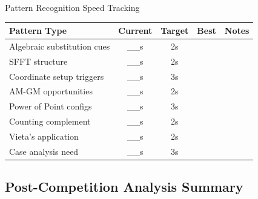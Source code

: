 \documentclass{article}
\begin{document}
\begin{analysisbox}{Pattern Recognition Speed Tracking}
\begin{center}
\begin{tabular}{|l|c|c|c|c|}
\hline
\textbf{Pattern Type} & \textbf{Current} & \textbf{Target} & \textbf{Best} & \textbf{Notes} \\
\hline
Algebraic substitution cues & \_\_s & 2s & & \\
SFFT structure & \_\_s & 2s & & \\
Coordinate setup triggers & \_\_s & 3s & & \\
AM-GM opportunities & \_\_s & 2s & & \\
Power of Point configs & \_\_s & 3s & & \\
Counting complement & \_\_s & 2s & & \\
Vieta's application & \_\_s & 2s & & \\
Case analysis need & \_\_s & 3s & & \\
\hline
\end{tabular}
\end{center}
\end{analysisbox}

\subsection{Post-Competition Analysis Summary}
\end{document}
